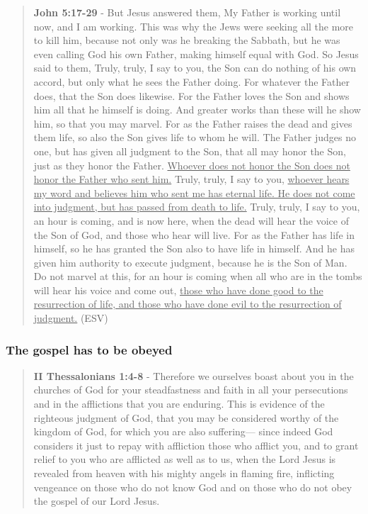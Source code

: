 \documentclass[11pt]{article}
\begin{document}
\begin{quote}
\textbf{John 5:17-29} - But Jesus answered them, My Father is working until now, and I am working. This was why the Jews were seeking all the more to kill him, because not only was he breaking the Sabbath, but he was even calling God his own Father, making himself equal with God. So Jesus said to them, Truly, truly, I say to you, the Son can do nothing of his own accord, but only what he sees the Father doing. For whatever the Father does, that the Son does likewise. For the Father loves the Son and shows him all that he himself is doing. And greater works than these will he show him, so that you may marvel. For as the Father raises the dead and gives them life, so also the Son gives life to whom he will. The Father judges no one, but has given all judgment to the Son, that all may honor the Son, just as they honor the Father. \uline{Whoever does not honor the Son does not honor the Father who sent him.} Truly, truly, I say to you, \uline{whoever hears my word and believes him who sent me has eternal life. He does not come into judgment, but has passed from death to life.} Truly, truly, I say to you, an hour is coming, and is now here, when the dead will hear the voice of the Son of God, and those who hear will live. For as the Father has life in himself, so he has granted the Son also to have life in himself. And he has given him authority to execute judgment, because he is the Son of Man. Do not marvel at this, for an hour is coming when all who are in the tombs will hear his voice and come out, \uline{those who have done good to the resurrection of life, and those who have done evil to the resurrection of judgment.} (ESV)
\end{quote}

\subsubsection{The gospel has to be obeyed}
\label{sec:org0664ff7}
\begin{quote}
\textbf{II Thessalonians 1:4-8} - Therefore we ourselves boast about you in the churches of God for your steadfastness and faith in all your persecutions and in the afflictions that you are enduring. This is evidence of the righteous judgment of God, that you may be considered worthy of the kingdom of God, for which you are also suffering— since indeed God considers it just to repay with affliction those who afflict you, and to grant relief to you who are afflicted as well as to us, when the Lord Jesus is revealed from heaven with his mighty angels in flaming fire, inflicting vengeance on those who do not know God and on those who do not obey the gospel of our Lord Jesus.
\end{quote}
\end{document}
